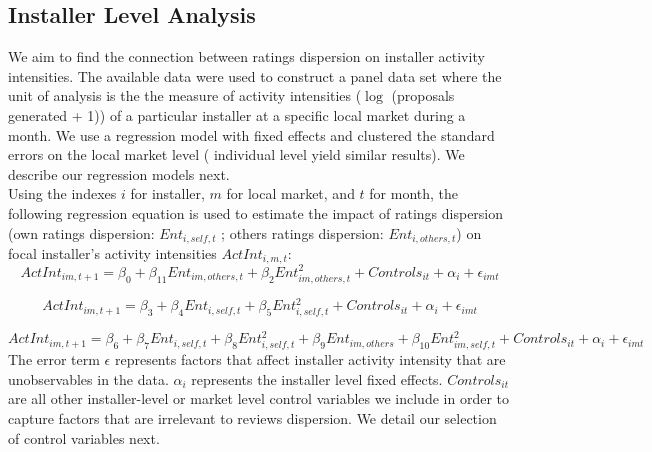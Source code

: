 \documentclass[msom,blindrev]{informs3}
\begin{document}
\subsection{Installer Level Analysis}
We aim to find the connection between ratings dispersion on installer activity intensities. The available data were used to construct a panel data set where the unit of analysis is the the measure of activity intensities ($\log$ (proposals generated + 1)) of a particular installer at a specific local market during a month. We use a regression model with fixed effects and clustered the standard errors on the local market level ( individual level yield similar results). We describe our regression models next. \\
Using the indexes $i$ for installer, $m$ for local market, and $t$ for month, the following regression equation is used to estimate the impact of ratings dispersion (own ratings dispersion: $Ent_{i,self,t}$ ; others ratings dispersion: $Ent_{i,others,t}$) on focal installer's activity intensities $ActInt_{i,m,t}$:
\begin{equation}
    ActInt_{im,t+1}=\beta_{0}+\beta_{11} Ent_{im,others,t}+\beta_{2}Ent_{im,others,t}^2+
   Controls_{it}+\alpha_{i}+\epsilon_{imt}
   \label{model_ind_1}
\end{equation}

\begin{equation}
    ActInt_{im,t+1}=\beta_{3}+\beta_{4} Ent_{i,self,t}+\beta_{5}Ent_{i,self,t}^2+
   Controls_{it}+\alpha_{i}+\epsilon_{imt}
   \label{model_ind_2}
\end{equation}

\begin{equation}
    ActInt_{im,t+1}=\beta_{6}+\beta_{7}Ent_{i,self,t}+\beta_{8}Ent_{i,self,t}^2+\beta_{9}Ent_{im,others}+\beta_{10}Ent_{im,self,t}^2+Controls_{it}+\alpha_{i}+\epsilon_{imt}
   \label{model_ind_3}
\end{equation}
 The error term $\epsilon$ represents factors that affect installer activity intensity that are unobservables in the data. $\alpha_{i}$ represents the installer level fixed effects. $Controls_{it}$ are all other installer-level or market level control variables we include in order to capture factors that are irrelevant to reviews dispersion. We detail our selection of control variables next.
\end{document}
